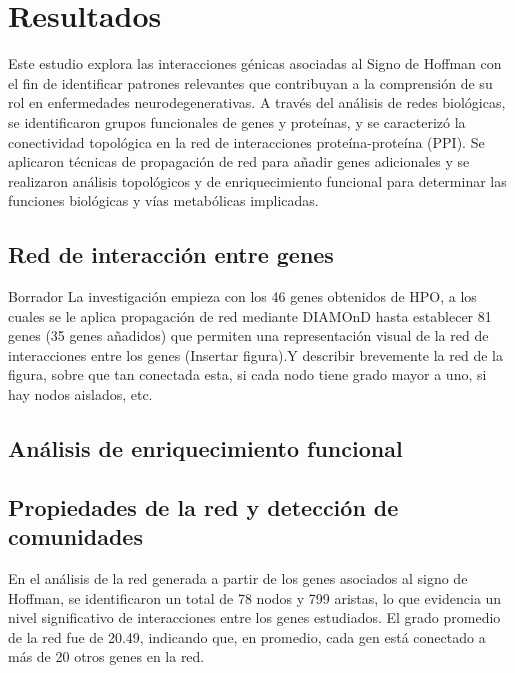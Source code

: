 \section{Resultados}

Este estudio explora las interacciones génicas asociadas al Signo de Hoffman con el fin de identificar patrones relevantes que contribuyan a la comprensión de su rol en enfermedades neurodegenerativas. A través del análisis de redes biológicas, se identificaron grupos funcionales de genes y proteínas, y se caracterizó la conectividad topológica en la red de interacciones proteína-proteína (PPI). Se aplicaron técnicas de propagación de red para añadir genes adicionales y se realizaron análisis topológicos y de enriquecimiento funcional para determinar las funciones biológicas y vías metabólicas implicadas.

\subsection{Red de interacción entre genes}

Borrador
La investigación empieza con los 46 genes obtenidos de HPO, a los cuales se le aplica propagación de red mediante DIAMOnD hasta establecer 81 genes (35 genes añadidos) que permiten una representación visual de la red de interacciones entre los genes (Insertar figura).Y describir brevemente la red de la figura, sobre que tan conectada esta, si cada nodo tiene grado mayor a uno, si hay nodos aislados, etc.

\subsection{Análisis de enriquecimiento funcional}

\subsection{Propiedades de la red y detección de comunidades}

En el análisis de la red generada a partir de los genes asociados al signo de Hoffman, se identificaron un total de 78 nodos y 799 aristas, lo que evidencia un nivel significativo de interacciones entre los genes estudiados. El grado promedio de la red fue de 20.49, indicando que, en promedio, cada gen está conectado a más de 20 otros genes en la red.

